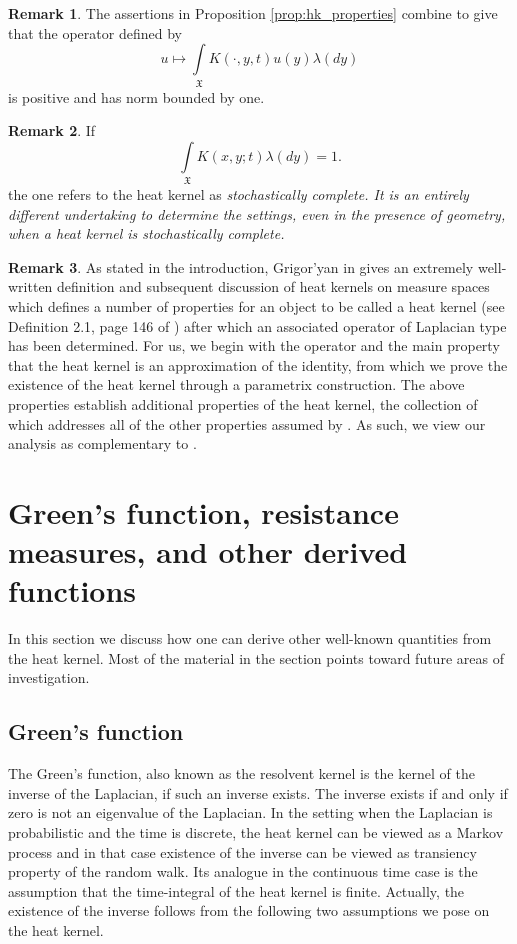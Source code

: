 \documentclass[11pt,reqno]{amsart}
\theoremstyle{remark}
\theoremstyle{definition}
\newtheorem{remark}{Remark}
\numberwithin{theorem}{section} \numberwithin{equation}{section}
\newcommand{\X}{\mathfrak{X}}
\begin{document}
\begin{remark} The assertions in Proposition \ref{prop:hk_properties} combine to
give that the operator defined by
\begin{equation}\label{eq:positive_operator}
u \mapsto \int\limits_{\X}K(\cdot,y,t)u(y)\lambda(dy)
\end{equation}
is positive and has norm bounded by one.
\end{remark}

\begin{remark}
If
$$
\int\limits_{\X}K(x,y;t)\lambda(dy) = 1.
$$
the one refers to the heat kernel as \it stochastically complete. \rm
It is an entirely different undertaking to determine the settings, even in the presence of
geometry, when a heat kernel is stochastically complete.
\end{remark}

\begin{remark}
As stated in the introduction, Grigor'yan in \cite{Gr03} gives an extremely well-written
definition and subsequent discussion of heat kernels on measure spaces which defines a number
of properties for an object to be called a heat kernel (see Definition 2.1, page 146 of \cite{Gr03})
after which an associated operator of Laplacian type has been determined.  For us, we begin
with the operator and the main property that the heat kernel is an approximation of the identity,
from which we prove the existence of the heat kernel through a parametrix construction.  The above
properties establish additional properties of the heat kernel, the collection of which addresses
all of the other properties assumed by \cite{Gr03}.  As such, we view our analysis as complementary
to \cite{Gr03}.
\end{remark}


\section{Green's function, resistance measures, and other derived functions}

In this section we discuss how one can derive other well-known quantities from the heat kernel.  Most of
the material in the section points toward future areas of investigation.

\subsection{Green's function}

The Green's function, also known as the resolvent kernel is the kernel of the inverse of the Laplacian, if such an inverse exists. The inverse exists if and only if zero is not an eigenvalue of the Laplacian. In the setting when the Laplacian is probabilistic and the time is discrete, the heat kernel can be viewed as a Markov process and in that case existence of the inverse can be viewed as transiency property of the random walk. Its analogue in the continuous time case is the assumption that the time-integral of the heat kernel is finite.
Actually, the existence of the inverse follows from the following two assumptions we pose on the heat kernel.
\end{document}
